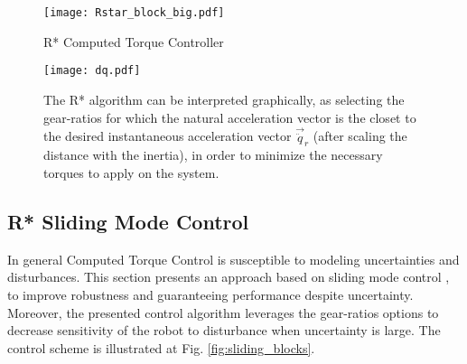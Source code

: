 \begin{figure}[t]
	\centering
		\texttt{[image: Rstar\_block\_big.pdf]}
	\caption{R* Computed Torque Controller}
	\label{fig:Rstar_block_big}
\end{figure}

\begin{figure}[htp]
	\centering
		\texttt{[image: dq.pdf]}
	\caption[R* algorithm graphical interpretation]{The R* algorithm can be interpreted graphically, as selecting the gear-ratios for which the natural acceleration vector is the closet to the desired instantaneous acceleration vector $\vec{\ddot{q}}_r$ (after scaling the distance with the inertia), in order to minimize the necessary torques to apply on the system.}
	\label{fig:dq}
\end{figure}

\subsection{R* Sliding Mode Control}
\label{sec:slidingmode}

In general Computed Torque Control is susceptible to modeling uncertainties and disturbances. This section presents an approach based on sliding mode control \cite{slotine_applied_1991}, to improve robustness and guaranteeing performance despite uncertainty. Moreover, the presented control algorithm leverages the gear-ratios options to decrease sensitivity of the robot to disturbance when uncertainty is large. The control scheme is illustrated at Fig. \ref{fig:sliding_blocks}.

